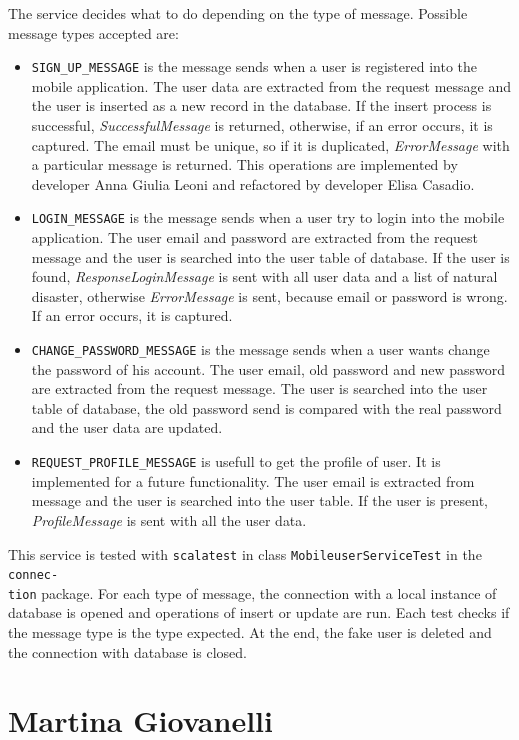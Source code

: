 \documentclass[a4paper,12pt]{report}
\begin{document}
The service decides what to do depending on the type of message. Possible message types accepted are:
\begin{itemize}
\item \texttt{SIGN\_UP\_MESSAGE} is the message sends when a user is registered into the mobile application. The user data are extracted from the request message and the user is inserted as a new record in the database. If the insert process is successful, \emph{SuccessfulMessage} is returned, otherwise, if an error occurs, it is captured. The email must be unique, so if it is duplicated, \emph{ErrorMessage} with a particular message is returned. This operations are implemented by developer Anna Giulia Leoni and refactored by developer Elisa Casadio.
\item \texttt{LOGIN\_MESSAGE} is the message sends when a user try to login into the mobile application. The user email and password are extracted from the request message and the user is searched into the user table of database. If the user is found, \emph{ResponseLoginMessage} is sent with all user data and a list of natural disaster, otherwise \emph{ErrorMessage} is sent, because email or password is wrong. If an error occurs, it is captured.
\item \texttt{CHANGE\_PASSWORD\_MESSAGE} is the message sends when a user wants change the password of his account. The user email, old password and new password are extracted from the request message. The user is searched into the user table of database, the old password send is compared with the real password and the user data are updated.
\item \texttt{REQUEST\_PROFILE\_MESSAGE} is usefull to get the profile of user. It is implemented for a future functionality. The user email is extracted from message and the user is searched into the user table. If the user is present, \emph{ProfileMessage} is sent with all the user data.
\end{itemize}

This service is tested with \texttt{scalatest} in class \texttt{MobileuserServiceTest} in the \texttt{connec-\\tion} package. For each type of message, the connection with a local instance of database is opened and operations of insert or update are run. Each test checks if the message type is the type expected. At the end, the fake user is deleted and the connection with database is closed.

\section{Martina Giovanelli}
\end{document}

